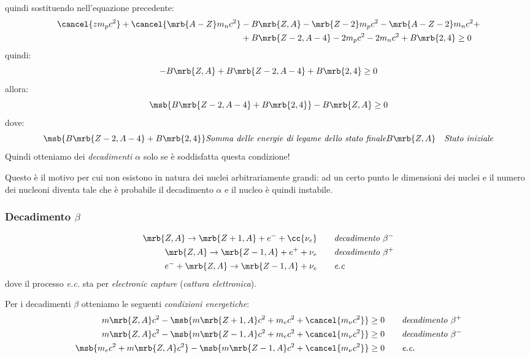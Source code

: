 quindi sostituendo nell'equazione precedente:
\begin{align*}
  \cancel{z m_p c^2} + \cancel{\mrb{A-Z} m_n c^2} & - B \mrb{Z,A} - \mrb{Z-2}
  m_p c^2 - \mrb{A - Z - 2} m_n c^2 +
  \\
  & + B \mrb{Z - 2, A - 4} - 2 m_p c^2 - 2 m_n c^2
  + B \mrb{2, 4} \geq 0 %
\end{align*}
quindi:
\[
  - B \mrb{Z,A} + B \mrb{Z-2, A-4} + B \mrb{2,4} \geq 0
\]
allora:
\[
  \msb{B \mrb{Z-2, A-4} + B \mrb{2,4}} - B \mrb{Z,A} \geq 0
\]
dove:
\begin{align*}
  \msb{B \mrb{Z-2, A-4} + B \mrb{2,4}} &\textit{Somma delle energie di legame
  dello stato finale}
  B \mrb{Z,A} &\textit{Stato iniziale}
\end{align*}
Quindi otteniamo dei \textit{decadimenti $\alpha$} solo se è soddisfatta questa
condizione!

\begin{note}[]
  Questo è il motivo per cui non esistono in natura dei nuclei arbitrariamente
  grandi: ad un certo punto le dimensioni dei nuclei e il numero dei nucleoni
  diventa tale che è probabile il decadimento $\alpha$ e il nucleo è quindi
  instabile.
\end{note}

\subsubsection{Decadimento $\beta$}
\begin{align*}
  \mrb{Z,A} \rightarrow \mrb{Z+1,A} + e^- + \cc{\nu_e} &
  \qquad\textit{decadimento $\beta^-$}
  \\
  \mrb{Z,A} \rightarrow \mrb{Z-1,A} + e^+ + \nu_e &\qquad\textit{decadimento
  $\beta^+$}
  \\
  e^- + \mrb{Z,A} \rightarrow \mrb{Z-1,A} + \nu_e &\qquad\textit{e.c}
\end{align*}
dove il processo \textit{e.c.} sta per \textit{electronic capture}
(\textit{cattura elettronica}).

Per i decadimenti $\beta$ otteniamo le seguenti \textit{condizioni
energetiche}:
\begin{align*}
  m \mrb{Z,A} c^2 - \msb{m \mrb{Z+1,A}c^2 + m_e c^2 + \cancel{m_{\nu}c^2}} \geq
  0 &\qquad\textit{decadimento $\beta^+$}
  \\
  m \mrb{Z,A} c^2 - \msb{m \mrb{Z-1,A}c^2 + m_e c^2 + \cancel{m_{\nu}c^2}} \geq
  0 &\qquad\textit{decadimento $\beta^-$}
  \\
  \msb{m_e c^2 + m \mrb{Z,A} c^2} - \msb{m \mrb{Z-1,A} c^2 + \cancel{m_{\nu}
  c^2}} \geq 0 &\qquad\textit{e.c.}
\end{align*}

